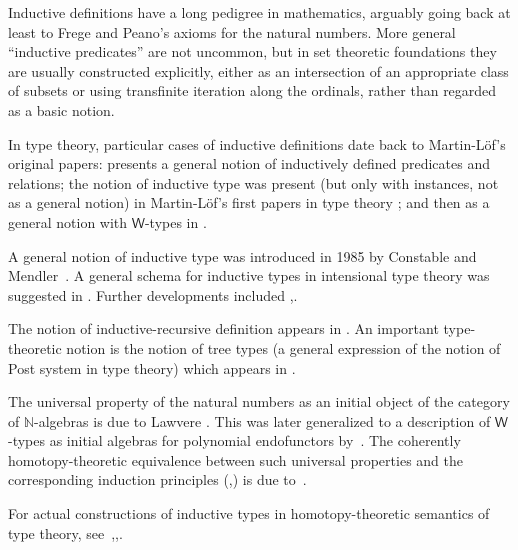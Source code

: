\documentclass[12pt]{article}
\newcommand{\N}{\ensuremath{\mathbb{N}}\xspace}
\newcommand{\w}{\mathsf{W}}
\let\nat\N
\begin{document}
Inductive definitions have a long pedigree in mathematics, arguably going back at least to Frege and Peano's axioms for the natural numbers. %
More general ``inductive predicates'' are not uncommon, but in set theoretic foundations they are usually constructed explicitly, either as an intersection of an appropriate class of subsets or using transfinite iteration along the ordinals, rather than regarded as a basic notion.

In type theory, particular cases of inductive definitions date back to Martin-L\"of's original papers: \cite{martin-lof-hauptsatz} presents a general notion of inductively defined predicates and relations; the notion of inductive type was present (but only with instances, not as a general notion) in Martin-L\"of's first papers in type theory \cite{Martin-Lof-1973};
and then as a general notion with $\w$-types in \cite{Martin-Lof-1979}.%

A general notion of inductive type was introduced in 1985 by Constable and Mendler~\cite{DBLP:conf/lop/ConstableM85}.  A general schema for inductive types in intensional type theory was suggested in
\cite{PfenningPaulinMohring}.  Further developments included \cite{CoquandPaulin},\cite{ Dybjer:1991}.

The notion of inductive-recursive definition appears in \cite{Dybjer:2000}. An important  type-theoretic notion is the notion of tree types (a general expression of the notion of Post system in type theory) which appears in \cite{PeterssonSynek}.

The universal property of the natural numbers as an initial object of the category of $\nat$-algebras is due to Lawvere \cite{lawvere:adjinfound}.
This was later generalized to a description of $\w$-types as initial algebras for polynomial endofunctors by~\cite{mp:wftrees}.
The coherently homotopy-theoretic equivalence between such universal properties and the corresponding induction principles (,) is due to~\cite{ags:it-hott}.

For actual constructions of inductive types in homotopy-theoretic semantics of type theory, see~\cite{klv:ssetmodel},\cite{mvdb:wtypes},\cite{ls:hits}.
\end{document}
